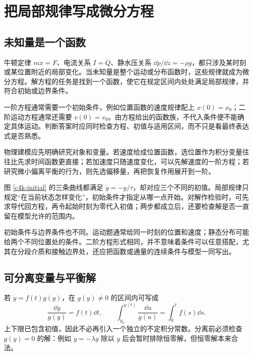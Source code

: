 \section{把局部规律写成微分方程}
\subsection{未知量是一个函数}
牛顿定律 $m\ddot x=F$、电流关系 $I=\dot Q$、静水压关系 $\dd p/\dd z=-\rho g$，都只涉及某时刻或某位置附近的局部变化。当未知量是整个运动或分布函数时，这些规律就成为微分方程。解方程的任务是找到一个函数，使它在规定区间内处处满足局部规律，并符合初始或边界条件。

一阶方程通常需要一个初始条件，例如位置函数的速度规律配上 $x(0)=x_0$；二阶运动方程通常还需要 $v(0)=v_0$。由方程给出的函数族，不代入条件便不能确定具体运动。判断答案时应同时检查方程、初值与适用区间，而不只是看最终表达式是否熟悉。

物理建模应先明确研究对象和变量。若速度给成位置函数，选位置作为积分变量往往比先求时间函数更直接；若加速度只随速度变化，可以先解速度的一阶方程；若研究微小偏离平衡的行为，则先选偏移量，再把恢复作用展开到一阶。

图 \ref{c4k-initial} 的三条曲线都满足 $\dot y=-y/\tau$，却对应三个不同的初值。局部规律只规定“在当前状态怎样变化”，初始条件才指定从哪一点开始。对解作检验时，可先求导代回方程，再令起始时刻为零代入初值；两步都成立后，还要检查解是否一直留在模型允许的范围内。

初始条件与边界条件也不同。运动题通常给同一时刻的位置和速度；静态分布可能给两个不同位置处的条件。二阶方程形式相同，并不意味着条件可以任意搭配，尤其在分段介质和接触边界处，还应把函数或通量的连续条件与模型一同写出。

\subsection{可分离变量与平衡解}
若 $\dot y=f(t)g(y)$，在 $g(y)\ne0$ 的区间内可写成
\[
 \frac{\dd y}{g(y)}=f(t)\dd t,\qquad
 \int_{y_0}^{y(t)}\frac{\dd u}{g(u)}
 =\int_0^t f(s)\dd s.
\]
上下限已包含初值，因此不必再引入一个独立的不定积分常数。分离前必须检查 $g(y)=0$ 的解：例如 $\dot y=-\lambda y$ 除以 $y$ 后会暂时排除恒零解，但恒零解本来合法。

